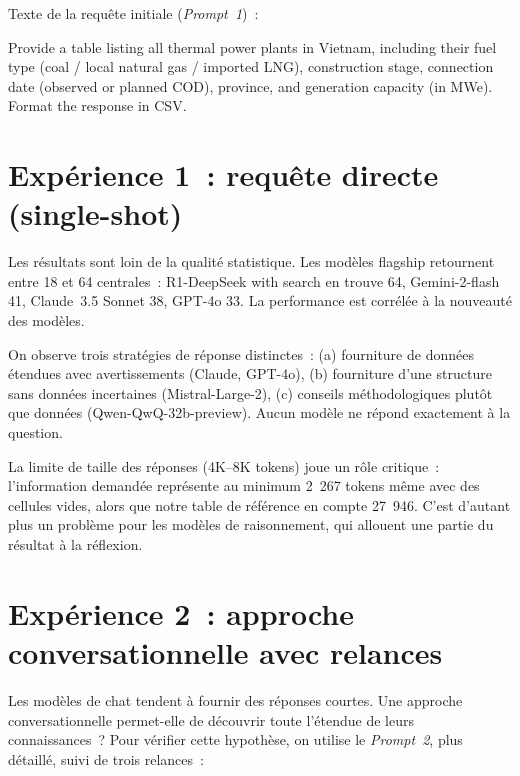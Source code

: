 \documentclass[a4paper,11pt]{report}
\begin{document}
Texte de la requête initiale (\emph{Prompt~1})~:

\begin{Prompt}
Provide a table listing all thermal power plants in Vietnam, including their
fuel type (coal / local natural gas / imported LNG), construction stage,
connection date (observed or planned COD), province, and generation capacity
(in MWe). Format the response in CSV.
\end{Prompt}

\section{Expérience 1~: requête directe (single-shot)}\label{sec:exp1}

Les résultats sont loin de la qualité statistique. Les modèles flagship retournent entre 18 et 64 centrales~: R1-DeepSeek with search en trouve 64, Gemini-2-flash 41, Claude~3.5 Sonnet 38, GPT-4o 33. La performance est corrélée à la nouveauté des modèles.

On observe trois stratégies de réponse distinctes~: (a) fourniture de données étendues avec avertissements (Claude, GPT-4o), (b) fourniture d'une structure sans données incertaines (Mistral-Large-2), (c) conseils méthodologiques plutôt que données (Qwen-QwQ-32b-preview). Aucun modèle ne répond exactement à la question.

La limite de taille des réponses (4K--8K tokens) joue un rôle critique~: l'information demandée représente au minimum 2~267 tokens même avec des cellules vides, alors que notre table de référence \citep{NLN8GPNI} en compte 27~946. C'est d'autant plus un problème pour les modèles de raisonnement, qui allouent une partie du résultat à la réflexion.



\section{Expérience 2~: approche conversationnelle avec relances}\label{sec:exp2}

Les modèles de chat tendent à fournir des réponses courtes. Une approche conversationnelle permet-elle de découvrir toute l'étendue de leurs connaissances~? Pour vérifier cette hypothèse, on utilise le \emph{Prompt~2}\label{sec:methode}, plus détaillé, suivi de trois relances~:
\end{document}
